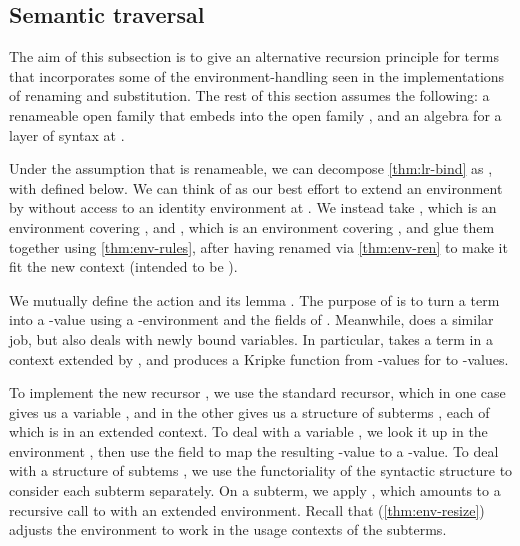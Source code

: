 \subsection{Semantic traversal}

The aim of this subsection is to give an alternative recursion principle for
terms that incorporates some of the environment-handling seen in the
implementations of renaming and substitution.
The rest of this section assumes the following: a renameable open family
\AgdaBound{$\V$} that embeds into the open family \AgdaBound{$\C$}, and an
algebra for a layer of syntax at \AgdaBound{$\C$}.



Under the assumption that \AgdaBound{$\V$} is renameable, we can decompose
\cref{thm:lr-bind} as
\AgdaSpace{}\AgdaOperator{\AgdaFunction{$\circ$}}%
\AgdaSpace{}, with  defined below.
We can think of  as our best effort to extend an
environment by \AgdaBound{$\Theta$} without access to an identity environment
at \AgdaBound{$\Theta$}.
We instead take \AgdaBound{$\rho$}, which is an environment covering
\AgdaBound{$\Delta$}, and \AgdaBound{$\sigma$}, which is an environment
covering \AgdaBound{$\Theta$}, and glue them together using
\cref{thm:env-rules}, after having renamed \AgdaBound{$\rho$} via
\cref{thm:env-ren} to make it fit the new context \AgdaBound{$\Gamma^+$}
(intended to be ).


We mutually define the action  and its lemma
.
The purpose of  is to turn a term into a
\AgdaBound{$\C$}-value using a \AgdaBound{$\V$}-environment and the fields of
.
Meanwhile,  does a similar job, but also deals with
newly bound variables.
In particular,  takes a term in a context extended by
\AgdaBound{$\Theta$}, and produces a Kripke function from
\AgdaBound{$\V$}-values for \AgdaBound{$\Theta$} to \AgdaBound{$\C$}-values.


To implement the new recursor , we use the standard
recursor, which in one case gives us a variable , and in the other
gives us a structure of subterms , each of which is in an extended
context.
To deal with a variable , we look it
up in the environment \AgdaBound{$\rho$}, then use the
 field to map the resulting
\AgdaBound{$\V$}-value to a \AgdaBound{$\C$}-value.
To deal with a structure of subtems , we use the functoriality of
the syntactic structure to consider each subterm separately.
On a subterm, we apply , which amounts to a recursive call
to  with an extended environment.
Recall that  (\cref{thm:env-resize}) adjusts the
environment \AgdaBound{$\rho$} to work in the usage contexts of the subterms.

